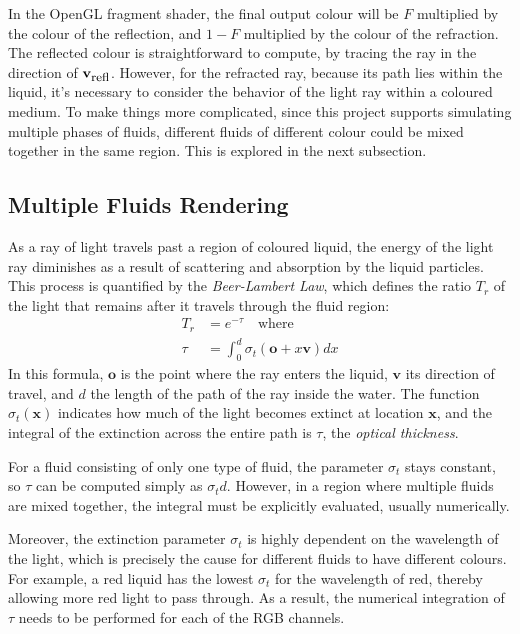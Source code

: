 In the OpenGL fragment shader, the final output colour will be $F$ multiplied by the colour of the reflection, and $1-F$ multiplied by the colour of the refraction. The reflected colour is straightforward to compute, by tracing the ray in the direction of $\textbf{v}_{\mbox{\small{refl}}}$. However, for the refracted ray, because its path lies within the liquid, it's necessary to consider the behavior of the light ray within a coloured medium. To make things more complicated, since this project supports simulating multiple phases of fluids, different fluids of different colour could be mixed together in the same region. This is explored in the next subsection.

\subsection{Multiple Fluids Rendering}
\label{subsection multiphase render}
As a ray of light travels past a region of coloured liquid, the energy of the light ray diminishes as a result of scattering and absorption by the liquid particles. This process is quantified by the \textit{Beer-Lambert Law}, which defines the ratio $T_r$ of the light that remains after it travels through the fluid region:
\begin{equation*}
    \begin{aligned}
        T_r &= e^{-\tau} \mbox{~~~where}\\
        \tau &= \int_0^{d} \sigma_t(\textbf{o}+x\textbf{v}) dx
    \end{aligned}
\end{equation*}
In this formula, $\textbf{o}$ is the point where the ray enters the liquid, $\textbf{v}$ its direction of travel, and $d$ the length of the path of the ray inside the water. The function $\sigma_t(\textbf{x})$ indicates how much of the light becomes extinct at location $\textbf{x}$, and the integral of the extinction across the entire path is $\tau$, the \textit{optical thickness}.

For a fluid consisting of only one type of fluid, the parameter $\sigma_t$ stays constant, so $\tau$ can be computed simply as $\sigma_td$. However, in a region where multiple fluids are mixed together, the integral must be explicitly evaluated, usually numerically.

Moreover, the extinction parameter $\sigma_t$ is highly dependent on the wavelength of the light, which is precisely the cause for different fluids to have different colours. For example, a red liquid has the lowest $\sigma_t$ for the wavelength of red, thereby allowing more red light to pass through. As a result, the numerical integration of $\tau$ needs to be performed for each of the RGB channels.

